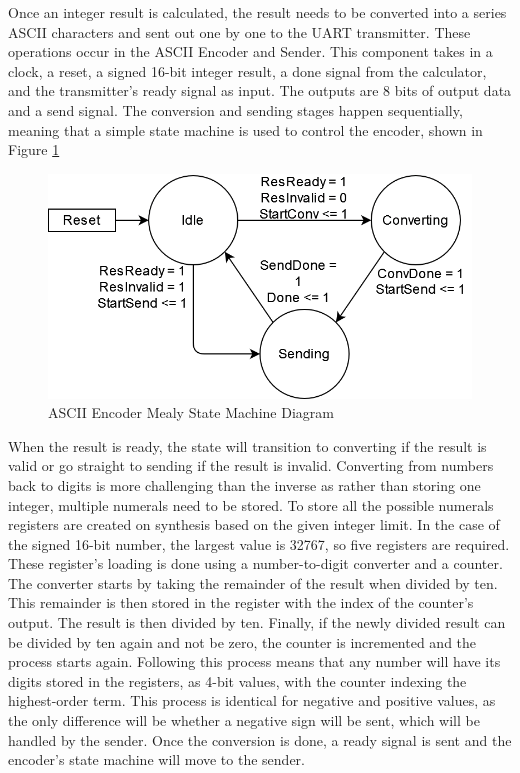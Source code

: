 \documentclass[11pt]{article}
\begin{document}
Once an integer result is calculated, the result needs to be converted into a series ASCII characters and sent out one by one to the UART transmitter.
These operations occur in the ASCII Encoder and Sender.
This component takes in a clock, a reset, a signed 16-bit integer result, a done signal from the calculator, and the transmitter's ready signal as input.
The outputs are 8 bits of output data and a send signal.
The conversion and sending stages happen sequentially, meaning that a simple state machine is used to control the encoder, shown in Figure \ref{fig:encodersm}


\begin{figure}%
    \centering
    \includegraphics[width=.5\textwidth]{EncoderSM.drawio.png}
    \caption{ASCII Encoder Mealy State Machine Diagram}
    \label{fig:encodersm}
\end{figure} 

When the result is ready, the state will transition to converting if the result is valid or go straight to sending if the result is invalid.
Converting from numbers back to digits is more challenging than the inverse as rather than storing one integer, multiple numerals need to be stored.
To store all the possible numerals registers are created on synthesis based on the given integer limit. 
In the case of the signed 16-bit number, the largest value is 32767, so five registers are required.
These register's loading is done using a number-to-digit converter and a counter.
The converter starts by taking the remainder of the result when divided by ten.
This remainder is then stored in the register with the index of the counter's output. 
The result is then divided by ten.
Finally, if the newly divided result can be divided by ten again and not be zero, the counter is incremented and the process starts again.
Following this process means that any number will have its digits stored in the registers, as 4-bit values, with the counter indexing the highest-order term.
This process is identical for negative and positive values, as the only difference will be whether a negative sign will be sent, which will be handled by the sender.
Once the conversion is done, a ready signal is sent and the encoder's state machine will move to the sender.
\end{document}
